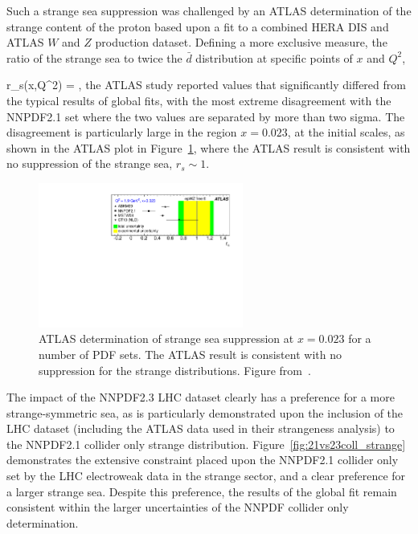 Such a strange sea suppression was challenged by an ATLAS determination of the strange content of the proton\cite{Aad:2012sb} based upon a fit to a combined HERA DIS and ATLAS $W$ and $Z$ production dataset. Defining a more exclusive measure, the ratio of the strange sea to twice the $\bar{d}$ distribution at specific points of $x$ and $Q^2$,

\be r_s(x,Q^2) = ,\ee
the ATLAS study reported values that significantly differed from the typical results of global fits, with the most extreme disagreement with the NNPDF2.1 set where the two values are separated by more than two sigma. The disagreement is particularly large in the region $x=0.023$, at the initial scales, as shown in the ATLAS plot in Figure~\ref{fig:ATLASepWZplot}, where the ATLAS result is consistent with no suppression of the strange sea, $r_s \sim 1$.

\begin{figure}[ht]
\centering
\includegraphics[width=0.60\textwidth]{6-LHCimpact/figs/ATLASepWZrs.pdf}
\caption[ATLAS determination of strange sea suppression]{ATLAS determination of strange sea suppression at $x=0.023$ for a number of PDF sets. The ATLAS result is consistent with no suppression for the strange distributions. Figure from~\cite{Aad:2012sb}.}
\label{fig:ATLASepWZplot}
\end{figure}

The impact of the NNPDF2.3 LHC dataset clearly has a preference for a more strange-symmetric sea, as is particularly demonstrated upon the inclusion of the LHC dataset (including the ATLAS data used in their strangeness analysis) to the NNPDF2.1 collider only strange distribution. Figure~\ref{fig:21vs23coll_strange} demonstrates the extensive constraint placed upon the NNPDF2.1 collider only set by the LHC electroweak data in the strange sector, and a clear preference for a larger strange sea. Despite this preference, the results of the global fit remain consistent within the larger uncertainties of the NNPDF collider only determination.

